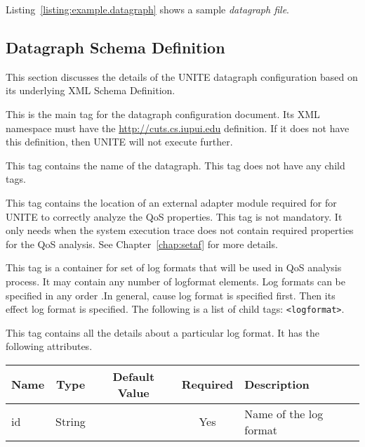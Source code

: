 Listing~\ref{listing:example.datagraph} shows a sample \textit{datagraph file}. 



\subsection{Datagraph Schema Definition}
\label{sec:datagraph}

This section discusses the details of the UNITE datagraph configuration 
based on its underlying XML Schema Definition.

This is the main tag for the datagraph configuration document. Its 
XML namespace must have the \url{http://cuts.cs.iupui.edu} definition. If it does
not have this definition, then UNITE will not execute further.


This tag contains the name of the datagraph. This tag does not have 
any child tags.


This tag contains the location of an external adapter module required for 
for UNITE to correctly analyze the QoS properties. This tag is not 
mandatory. It only needs when the system execution trace does not 
contain required properties for the QoS analysis. See Chapter~\ref{chap:setaf}
for more details.


This tag is a container for set of log formats that will be used in QoS 
analysis process. It may contain any number of logformat elements. 
Log formats can be specified in any order .In general, cause log format 
is specified first. Then its effect log format is specified. 
The following is a list of child tags: \texttt{<logformat>}.


This tag contains all the details about a particular log format. It has the following 
attributes.
\begin{table}[h]
  \begin{tabular}{lcccl}
  \hline
  \textbf{Name} & \textbf{Type} & \textbf{Default Value} & \textbf{Required} & \textbf{Description} \\
  \hline
  id & String  & & Yes & Name of the log format \\
  \end{tabular}
\end{table}

